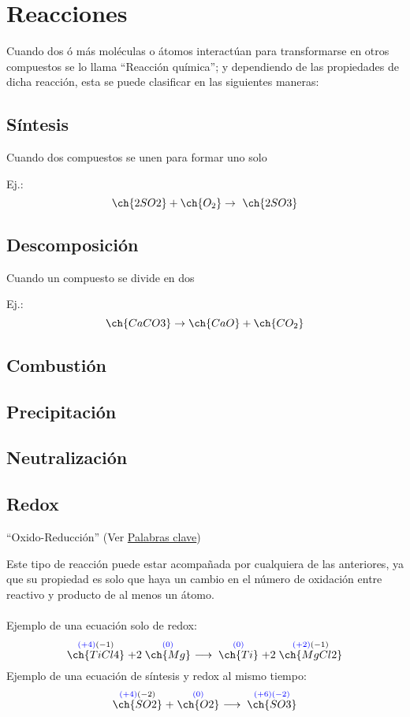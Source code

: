 \documentclass[../teoria.root.tex]{subfiles}
\begin{document}
\section{Reacciones}
Cuando dos ó más moléculas o átomos interactúan para transformarse en otros compuestos se lo llama ``Reacción química''; y dependiendo de las propiedades de dicha reacción, esta se puede clasificar en las siguientes maneras:

\subsection{Síntesis}
Cuando dos compuestos se unen para formar uno solo

Ej.:
\begin{equation}
	\ch{2 SO2} + \ch{O_2} \rightarrow\ \ch{2 SO3}
\end{equation}

\subsection{Descomposición}
Cuando un compuesto se divide en dos

Ej.:
\begin{equation}
	\ch{CaCO3} \rightarrow \ch{CaO} + \ch{CO_2}
\end{equation}

\subsection{Combustión}

\subsection{Precipitación}

\subsection{Neutralización}

\subsection{Redox}
``Oxido-Reducción'' (Ver \hyperref[sec:palabras clave]{Palabras clave})

Este tipo de reacción puede estar acompañada por cualquiera de las anteriores, ya que su propiedad es solo que haya un cambio en el número de oxidación entre reactivo y producto de al menos un átomo.
\\
\\
Ejemplo de una ecuación solo de redox:
\begin{equation}
	\sr{ \blue{(+4)}(-1) }{ \ch{TiCl4} }
	+ 2 \sr{ \blue{(0)} }{ \ch{Mg} }
	\ \lra \sr{ \blue{(0)} }{ \ch{Ti} }
	+ 2 \sr{ \blue{(+2)}(-1) }{ \ch{MgCl2} }
\end{equation}
Ejemplo de una ecuación de síntesis y redox al mismo tiempo:
\begin{equation}
	\sr{ \blue{(+4)}(-2) }{ \ch{SO2} } + \sr{ \blue{(0)} }{ \ch{O2} }
	\ \lra \sr{ \blue{(+6)(-2)} }{ \ch{SO3} }
\end{equation}
\end{document}
